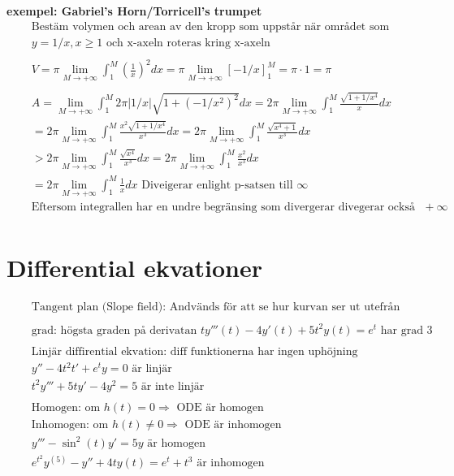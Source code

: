 \textbf{exempel: Gabriel's Horn/Torricell's trumpet }
\begin{align*}
  &\quad  \text{Bestäm volymen och arean av den kropp som uppstår när området som begränsas av kurvan } \\
  &\quad  y = 1/x, x\geq1 \text{ och x-axeln roteras kring x-axeln} \\
  &\quad  \\
  &\quad  V=\pi \lim_{M\to+\infty} \int_1^M {(\frac{1}{x})}^2 dx = \pi \lim_{M\to+\infty}{[-1/x]}_1^M
  = \pi\cdot1 = \pi \\
  &\quad  \\
  &\quad  A = \lim_{M\to+\infty}\int_1^M 2\pi|1/x|\sqrt{1+{(-1/x^2)}^2} dx
  = 2\pi \lim_{M\to+\infty}\int_1^M \frac{\sqrt{1+1/x^4}}{x} dx \\
  &\quad = 2\pi \lim_{M\to+\infty}\int_1^M \frac{x^2\sqrt{1+1/x^4}}{x^3} dx 
  = 2\pi \lim_{M\to+\infty}\int_1^M \frac{\sqrt{x^4+1}}{x^3} dx \\
  &\quad > 2\pi \lim_{M\to+\infty}\int_1^M \frac{\sqrt{x^4}}{x^3} dx
  = 2\pi \lim_{M\to+\infty}\int_1^M \frac{x^2}{x^3} dx \\
  &\quad = 2\pi \lim_{M\to+\infty}\int_1^M \frac{1}{x} dx  \text{ Diveigerar enlight p-satsen till } \infty \\
  &\quad \text{Eftersom integrallen har en undre begränsing som divergerar divegerar också integrallen till}
  +\infty \\
\end{align*}


\newpage


\section{Differential ekvationer}
 
\begin{align*}
  &\quad  \text{Tangent plan (Slope field):
    Andvänds för att se hur kurvan ser ut utefrån olika start värden.} \\
  &\quad  \\
  &\quad  \text{grad: högsta graden på derivatan }  t y'''(t) - 4y'(t) + 5t^2y(t) = e^t
  \text{ har grad 3} \\
  &\quad  \\
  &\quad  \text{Linjär diffirential ekvation: diff funktionerna har ingen uphöjning } \\
  &\quad  y'' - 4t^2t' + e^t y = 0 \text{ är linjär} \\
  &\quad  t^2 y''' + 5ty' - 4y^2 = 5 \text{ är inte linjär} \\
  &\quad  \\
  &\quad  \text{Homogen: om } h(t)=0 \Rightarrow \text{ ODE är homogen} \\
  &\quad  \text{Inhomogen: om } h(t)\neq0 \Rightarrow \text{ ODE är inhomogen} \\
  &\quad  y''' - \sin^2(t)y' = 5y \text{ är homogen} \\
  &\quad  e^{t^2} y^{(5)} - y'' + 4ty(t) = e^t + t^3 \text{ är inhomogen} \\
\end{align*}


